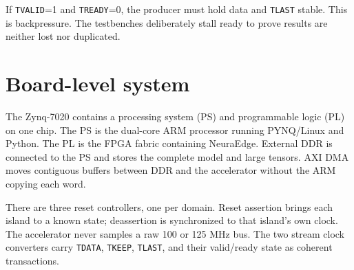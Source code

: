 \documentclass[10pt]{article}
\begin{document}
If \texttt{TVALID}=1 and \texttt{TREADY}=0, the producer must hold data and
\texttt{TLAST} stable. This is backpressure. The testbenches deliberately stall
ready to prove results are neither lost nor duplicated.

\section{Board-level system}

The Zynq-7020 contains a processing system (PS) and programmable logic (PL) on
one chip. The PS is the dual-core ARM processor running PYNQ/Linux and Python.
The PL is the FPGA fabric containing NeuraEdge. External DDR is connected to the
PS and stores the complete model and large tensors. AXI DMA moves contiguous
buffers between DDR and the accelerator without the ARM copying each word.

\begin{center}
\end{center}

There are three reset controllers, one per domain. Reset assertion brings each
island to a known state; deassertion is synchronized to that island's own
clock. The accelerator never samples a raw 100 or 125 MHz bus. The two stream
clock converters carry \texttt{TDATA}, \texttt{TKEEP}, \texttt{TLAST}, and their
valid/ready state as coherent transactions.
\end{document}
